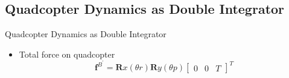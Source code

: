 \documentclass[10pt]{beamer}
\begin{document}
\subsection*{Quadcopter Dynamics as Double Integrator}
\begin{frame}{Quadcopter Dynamics as Double Integrator}
	\begin{minipage}{0.47\textwidth}
		\begin{itemize}
			\item Total force on quadcopter
			      \begin{equation*}
				      \mathbf{f}^{B^{\prime}}=\mathbf{R}{x}\left(\theta{r}\right) \mathbf{R}{y}\left(\theta{p}\right)\begin{bmatrix}
					      0 & 0 & T
				      \end{bmatrix}^{T}\label{eq:total_force}
			      \end{equation*}


\end{itemize}
\end{minipage}
\end{frame}
\end{document}
